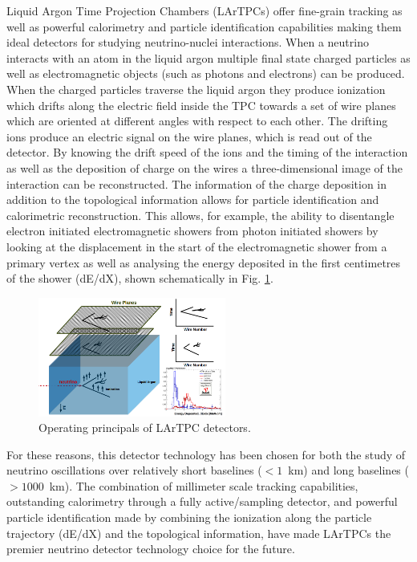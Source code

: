 Liquid Argon Time Projection Chambers (LArTPCs) offer fine-grain tracking as well as powerful calorimetry and particle identification capabilities making them ideal detectors for studying neutrino-nuclei interactions. When a neutrino interacts with an atom in the liquid argon multiple final state charged particles as well as electromagnetic objects (such as photons and electrons) can be produced. When the charged particles traverse the liquid argon they produce ionization which drifts along the electric field inside the TPC towards a set of wire planes which are oriented at different angles with respect to each other. The drifting ions produce an electric signal on the wire planes, which is read out of the detector. By knowing the drift speed of the ions and the timing of the interaction as well as the deposition of charge on the wires a three-dimensional image of the interaction can be reconstructed. The information of the charge deposition in addition to the topological information allows for particle identification and calorimetric reconstruction. This allows, for example, the ability to disentangle electron initiated electromagnetic showers from photon initiated showers by looking at the displacement in the start of the electromagnetic shower from a primary vertex as well as analysing the energy deposited in the first centimetres of the shower (dE/dX), shown schematically in Fig. \ref{fig:LArTPC}.

\begin{figure}[htb]
\centering
\includegraphics[width=0.55\textwidth]{images/lartpc.png}
\caption[]{Operating principals of LArTPC detectors.}
\label{fig:LArTPC}
\end{figure}

For these reasons, this detector technology has been chosen for both the study of neutrino oscillations over relatively short baselines ($<1$~km) and long baselines ($>1000$~km). The combination of millimeter scale tracking capabilities, outstanding calorimetry through a fully active/sampling detector, and powerful particle identification made by combining the ionization along the particle trajectory (dE/dX) and the topological information, have made LArTPCs the premier neutrino detector technology choice for the future. 

